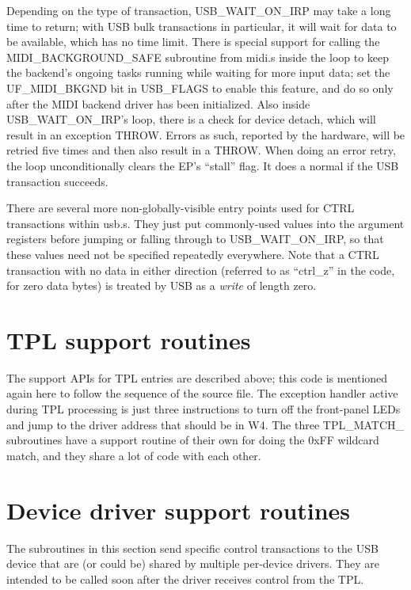 Depending on the type of transaction, USB\_WAIT\_ON\_IRP may take a long
time to return; with USB bulk transactions in particular, it will wait for
data to be available, which has no time limit.  There is special support for
calling the MIDI\_BACKGROUND\_SAFE subroutine from midi.s inside the loop to
keep the backend's ongoing tasks running while waiting for more input data;
set the UF\_MIDI\_BKGND bit in USB\_FLAGS to enable this feature, and do so
only after the MIDI backend driver has been initialized.  Also inside
USB\_WAIT\_ON\_IRP's loop, there is a check for device detach, which will
result in an exception THROW.  Errors as such, reported by the hardware,
will be retried five times and then also result in a THROW.  When doing an
error retry, the loop unconditionally clears the EP's ``stall'' flag.  It
does a normal  if the USB transaction succeeds.

There are several more non-globally-visible entry points used for CTRL
transactions within usb.s.  They just put commonly-used values into the
argument registers before jumping or falling through to USB\_WAIT\_ON\_IRP,
so that these values need not be specified repeatedly everywhere.  Note that
a CTRL transaction with no data in either direction (referred to as
``ctrl\_z'' in the code, for zero data bytes) is treated by USB as a
\emph{write} of length zero.

\section{TPL support routines}

The support APIs for TPL entries are described above; this code is mentioned
again here to follow the sequence of the source file.  The exception handler
active during TPL processing is just three instructions to turn off the
front-panel LEDs and jump to the driver address that should be in W4.  The
three TPL\_MATCH\_ subroutines have a support routine of their own for doing
the 0xFF wildcard match, and they share a lot of code with each other.

\section{Device driver support routines}

The subroutines in this section send specific control transactions to the
USB device that are (or could be) shared by multiple per-device drivers. 
They are intended to be called soon after the driver receives control from
the TPL.

